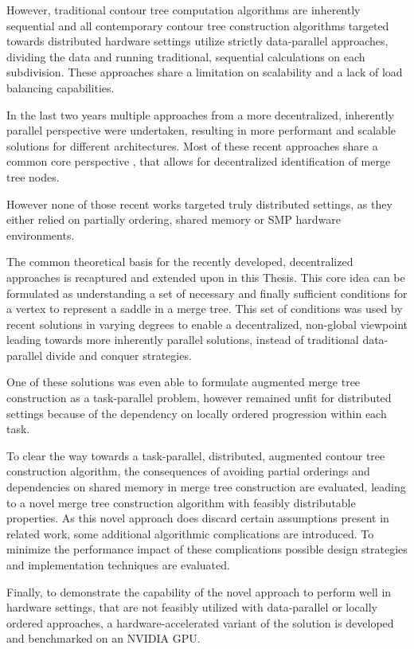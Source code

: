 \documentclass[%
	paper=A4,					%
	twoside=true,				%
	openright,					%
	parskip=full,				%
	chapterprefix=true,			%
	11pt,						%
	headings=normal,			%
	bibliography=totoc,			%
	listof=totoc,				%
	titlepage=on,				%
	captions=tableabove,		%
	draft=false,				%
]{scrreprt}%
\begin{document}
However, traditional contour tree computation algorithms are inherently sequential and all contemporary contour tree construction algorithms targeted towards distributed hardware settings utilize strictly data-parallel approaches, dividing the data and running traditional, sequential calculations on each subdivision. These approaches share a limitation on scalability and a lack of load balancing capabilities. 

In the last two years multiple approaches from a more decentralized, inherently parallel perspective were undertaken, resulting in more performant and scalable solutions for different architectures. Most of these recent approaches share a common core perspective \cite{base}, that allows for decentralized identification of merge tree nodes.

However none of those recent works targeted truly distributed settings, as they either relied on partially ordering, shared memory or SMP hardware environments.

The common theoretical basis for the recently developed, decentralized approaches is recaptured and extended upon in this Thesis. This core idea can be formulated as understanding a set of necessary and finally sufficient conditions for a vertex to represent a saddle in a merge tree. This set of conditions was used by recent solutions in varying degrees to enable a decentralized, non-global viewpoint leading towards more inherently parallel solutions, instead of traditional data-parallel divide and conquer strategies. 

One of these solutions \cite{FTM} was even able to formulate augmented merge tree construction as a task-parallel problem, however remained unfit for distributed settings because of the dependency on locally ordered progression within each task. 

To clear the way towards a task-parallel, distributed, augmented contour tree construction algorithm, the consequences of avoiding partial orderings and dependencies on shared memory in merge tree construction are evaluated, leading to a novel merge tree construction algorithm with feasibly distributable properties. As this novel approach does discard certain assumptions present in related work, some additional algorithmic complications are introduced. To minimize the performance impact of these complications possible design strategies and implementation techniques are evaluated. 

Finally, to demonstrate the capability of the novel approach to perform well in hardware settings, that are not feasibly utilized with data-parallel or locally ordered approaches, a hardware-accelerated variant of the solution is developed and benchmarked on an NVIDIA GPU. 
\end{document}
